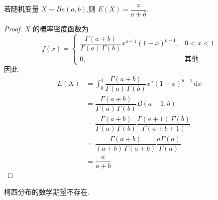 \begin{conclusion}
    \indent 若随机变量 $X \sim Be(a,b)$,则 $E(X) = \dfrac{a}{a+b}$.
\end{conclusion}

\begin{proof}
    $X$ 的概率密度函数为
    $$
    f(x) = \begin{cases}
        \dfrac{\Gamma(a+b)}{\Gamma(a) \, \Gamma(b)} x^{a-1} (1-x)^{b-1}, & 0<x<1 \\[0.5em]
        0, & \text{其他}
    \end{cases}
    $$
    因此
    $$
    \begin{aligned}
        E(X) &= \int_{0}^{1} \dfrac{\Gamma(a+b)}{\Gamma(a) \, \Gamma(b)} x^a (1-x)^{b-1} \, \text{d}x \\
        &= \dfrac{\Gamma(a+b)}{\Gamma(a) \, \Gamma(b)} B(a+1,b) \\
        &= \dfrac{\Gamma(a+b)}{\Gamma(a) \, \Gamma(b)} \dfrac{\Gamma(a+1) \, \Gamma(b)}{\Gamma(a+b+1)} \\
        &= \dfrac{\Gamma(a+b)}{(a+b) \, \Gamma(a+b)} \dfrac{a \Gamma(a)}{\Gamma(a)} \\
        &= \dfrac{a}{a+b}
    \end{aligned}
    $$
\end{proof}

\begin{conclusion}
    \indent 柯西分布的数学期望不存在.
\end{conclusion}

